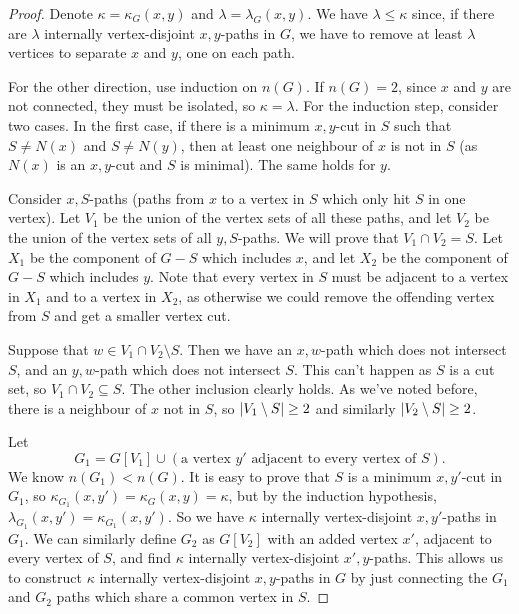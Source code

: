 \begin{proof}
  Denote $\kappa = \kappa_G(x,y)$ and $\lambda = \lambda_G(x,y)$.
  We have $\lambda \le \kappa$ since, if there are $\lambda$ internally
  vertex-disjoint $x,y$-paths in $G$, we have to remove at least $\lambda$
  vertices to separate $x$ and $y$, one on each path.

  For the other direction, use induction on $n(G)$.
  If $n(G) = 2$, since $x$ and $y$ are not connected, they must be isolated, so
  $\kappa = \lambda$.
  For the induction step, consider two cases.
  In the first case, if there is a minimum $x,y$-cut in $S$ such that $S \ne
  N(x)$ and $S \ne N(y)$, then at least one neighbour of $x$ is not in $S$ (as
  $N(x)$ is an $x,y$-cut and $S$ is minimal).
  The same holds for $y$.

  Consider $x,S$-paths (paths from $x$ to a vertex in $S$ which only hit $S$ in
  one vertex).
  Let $V_1$ be the union of the vertex sets of all these paths, and let $V_2$ be
  the union of the vertex sets of all $y,S$-paths.
  We will prove that $V_1 \cap V_2 = S$.
  Let $X_1$ be the component of $G-S$ which includes $x$, and let $X_2$ be the
  component of $G-S$ which includes $y$.
  Note that every vertex in $S$ must be adjacent to a vertex in $X_1$ and to a
  vertex in $X_2$, as otherwise we could remove the offending vertex from $S$
  and get a smaller vertex cut.

  Suppose that $w \in V_1 \cap V_2 \setminus S$.
  Then we have an $x,w$-path which does not intersect $S$, and an $y,w$-path
  which does not intersect $S$.
  This can't happen as $S$ is a cut set, so $V_1 \cap V_2 \subseteq S$.
  The other inclusion clearly holds.
  As we've noted before, there is a neighbour of $x$ not in $S$, so $\left| V_1
	\setminus S \right| \ge 2$ and similarly $\left| V_2 \setminus S \right| \ge 2$.

  Let
  \[
	G_1 = G[V_1] \cup (\text{a vertex $y'$ adjacent to every vertex of $S$}).
  \]
  We know $n(G_1) < n(G)$.
  It is easy to prove that $S$ is a minimum $x,y'$-cut in $G_1$, so
  $\kappa_{G_1}(x,y') = \kappa_G(x,y) = \kappa$, but by the induction
  hypothesis, $\lambda_{G_1}(x,y') = \kappa_{G_1}(x,y')$.
  So we have $\kappa$ internally vertex-disjoint $x,y'$-paths in $G_1$.
  We can similarly define $G_2$ as $G[V_2]$ with an added vertex $x'$, adjacent
  to every vertex of $S$, and find $\kappa$ internally vertex-disjoint
  $x',y$-paths.
  This allows us to construct $\kappa$ internally vertex-disjoint $x,y$-paths in
  $G$ by just connecting the $G_1$ and $G_2$ paths which share a common vertex
  in $S$.


\end{proof}
